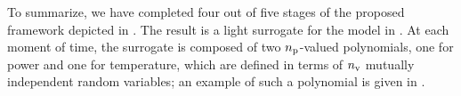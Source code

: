 To summarize, we have completed four out of five stages of the proposed framework depicted in .
The result is a light surrogate for the model in .
At each moment of time, the surrogate is composed of two ${n_\text{p}}$-valued polynomials, one for power and one for temperature, which are defined in terms of ${n_\text{v}}$ mutually independent random variables; an example of such a polynomial is given in .
